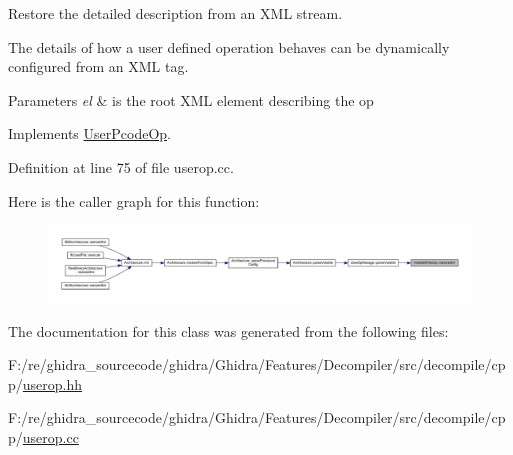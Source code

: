 Restore the detailed description from an X\+ML stream. 

The details of how a user defined operation behaves can be dynamically configured from an X\+ML tag. 
\begin{DoxyParams}{Parameters}
{\em el} & is the root X\+ML element describing the op \\
\hline
\end{DoxyParams}


Implements \mbox{\hyperlink{class_user_pcode_op_a2a7b7c637369bc4fba4604cd83a937af}{User\+Pcode\+Op}}.



Definition at line 75 of file userop.\+cc.

Here is the caller graph for this function\+:
\nopagebreak
\begin{figure}[H]
\begin{center}
\leavevmode
\includegraphics[width=350pt]{class_volatile_write_op_a7d0ae9b968d11ff809a46dec31e94d43_icgraph}
\end{center}
\end{figure}


The documentation for this class was generated from the following files\+:\begin{DoxyCompactItemize}
\item 
F\+:/re/ghidra\+\_\+sourcecode/ghidra/\+Ghidra/\+Features/\+Decompiler/src/decompile/cpp/\mbox{\hyperlink{userop_8hh}{userop.\+hh}}\item 
F\+:/re/ghidra\+\_\+sourcecode/ghidra/\+Ghidra/\+Features/\+Decompiler/src/decompile/cpp/\mbox{\hyperlink{userop_8cc}{userop.\+cc}}\end{DoxyCompactItemize}
